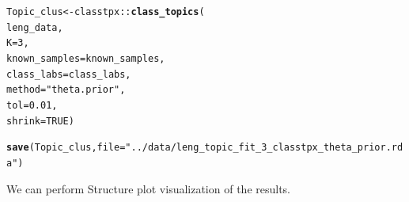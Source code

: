 \documentclass[12pt]{article}\usepackage[]{graphicx}\usepackage[usenames,dvipsnames]{color}
\makeatletter
\newcommand{\hlnum}[1]{\textcolor[rgb]{0.686,0.059,0.569}{#1}}%
\newcommand{\hlstr}[1]{\textcolor[rgb]{0.192,0.494,0.8}{#1}}%
\newcommand{\hlopt}[1]{\textcolor[rgb]{0,0,0}{#1}}%
\newcommand{\hlstd}[1]{\textcolor[rgb]{0.345,0.345,0.345}{#1}}%
\newcommand{\hlkwb}[1]{\textcolor[rgb]{0.69,0.353,0.396}{#1}}%
\newcommand{\hlkwc}[1]{\textcolor[rgb]{0.333,0.667,0.333}{#1}}%
\newcommand{\hlkwd}[1]{\textcolor[rgb]{0.737,0.353,0.396}{\textbf{#1}}}%
\newenvironment{kframe}{%
 \def\at@end@of@kframe{}%
 \ifinner\ifhmode%
  \def\at@end@of@kframe{\end{minipage}}%
  \begin{minipage}{\columnwidth}%
 \fi\fi%
 \def\FrameCommand##1{\hskip\@totalleftmargin \hskip-\fboxsep
 \colorbox{shadecolor}{##1}\hskip-\fboxsep
     \hskip-\linewidth \hskip-\@totalleftmargin \hskip\columnwidth}%
 \MakeFramed {\advance\hsize-\width
   \@totalleftmargin\z@ \linewidth\hsize
   \@setminipage}}%
 {\par\unskip\endMakeFramed%
 \at@end@of@kframe}
\newenvironment{knitrout}{}{} %
\makeatother
\begin{document}
\begin{knitrout}
\color{fgcolor}\begin{kframe}
\begin{alltt}
\hlstd{Topic_clus} \hlkwb{<-} \hlstd{classtpx}\hlopt{::}\hlkwd{class_topics}\hlstd{(}
    \hlstd{leng_data,}
    \hlkwc{K}\hlstd{=}\hlnum{3}\hlstd{,}
    \hlkwc{known_samples} \hlstd{= known_samples,}
    \hlkwc{class_labs} \hlstd{= class_labs,}
    \hlkwc{method}\hlstd{=}\hlstr{"theta.prior"}\hlstd{,}
    \hlkwc{tol}\hlstd{=}\hlnum{0.01}\hlstd{,}
    \hlkwc{shrink}\hlstd{=}\hlnum{TRUE}\hlstd{)}

\hlkwd{save}\hlstd{(Topic_clus,} \hlkwc{file}\hlstd{=}\hlstr{"../data/leng_topic_fit_3_classtpx_theta_prior.rda"}\hlstd{)}
\end{alltt}
\end{kframe}
\end{knitrout}

We can perform Structure plot visualization of the results.
\end{document}
